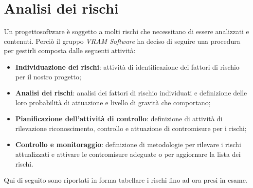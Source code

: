 \section{Analisi dei rischi}

Un progetto\glosp software è soggetto a molti rischi che necessitano di essere analizzati e contenuti. Perciò il gruppo \textit{VRAM Software} ha deciso di seguire una procedura per gestirli composta dalle seguenti attività:

\begin{itemize}
	\item \textbf{Individuazione dei rischi}: attività di identificazione dei fattori di rischio per il nostro progetto\glo;
	\item \textbf{Analisi dei rischi}: analisi dei fattori di rischio individuati e definizione delle loro probabilità di attuazione e livello di gravità che comportano;
	\item \textbf{Pianificazione dell'attività di controllo}: definizione di attività di rilevazione riconoscimento, controllo e attuazione di contromisure per i rischi;
	\item \textbf{Controllo e monitoraggio}: definizione di metodologie per rilevare i rischi attualizzati e attivare le contromisure adeguate o per aggiornare la lista dei rischi.
\end{itemize}

Qui di seguito sono riportati in forma tabellare i rischi fino ad ora presi in esame.
